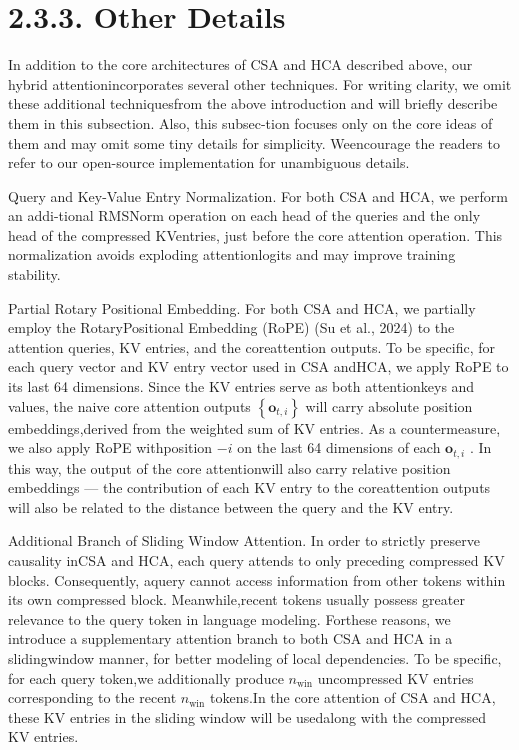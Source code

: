 \documentclass[
  10
]{article}
\begin{document}
\section{2.3.3. Other Details}\label{other-details}

In addition to the core architectures of CSA and HCA described above,
our hybrid attentionincorporates several other techniques. For writing
clarity, we omit these additional techniquesfrom the above introduction
and will briefly describe them in this subsection. Also, this
subsec-tion focuses only on the core ideas of them and may omit some
tiny details for simplicity. Weencourage the readers to refer to our
open-source implementation for unambiguous details.

Query and Key-Value Entry Normalization. For both CSA and HCA, we
perform an addi-tional RMSNorm operation on each head of the queries and
the only head of the compressed KVentries, just before the core
attention operation. This normalization avoids exploding attentionlogits
and may improve training stability.

Partial Rotary Positional Embedding. For both CSA and HCA, we partially
employ the RotaryPositional Embedding (RoPE) (Su et al., 2024) to the
attention queries, KV entries, and the coreattention outputs. To be
specific, for each query vector and KV entry vector used in CSA andHCA,
we apply RoPE to its last 64 dimensions. Since the KV entries serve as
both attentionkeys and values, the naive core attention outputs
\(\left\{ \mathbf { o } _ { t , i } \right\}\) will carry absolute
position embeddings,derived from the weighted sum of KV entries. As a
countermeasure, we also apply RoPE withposition \(- i\) on the last 64
dimensions of each \(\mathbf { o } _ { t , i }\) . In this way, the
output of the core attentionwill also carry relative position embeddings
--- the contribution of each KV entry to the coreattention outputs will
also be related to the distance between the query and the KV entry.

Additional Branch of Sliding Window Attention. In order to strictly
preserve causality inCSA and HCA, each query attends to only preceding
compressed KV blocks. Consequently, aquery cannot access information
from other tokens within its own compressed block. Meanwhile,recent
tokens usually possess greater relevance to the query token in language
modeling. Forthese reasons, we introduce a supplementary attention
branch to both CSA and HCA in a slidingwindow manner, for better
modeling of local dependencies. To be specific, for each query token,we
additionally produce \(n _ { \mathrm { w i n } }\) uncompressed KV
entries corresponding to the recent \(n _ { \mathrm { w i n } }\)
tokens.In the core attention of CSA and HCA, these KV entries in the
sliding window will be usedalong with the compressed KV entries.
\end{document}
